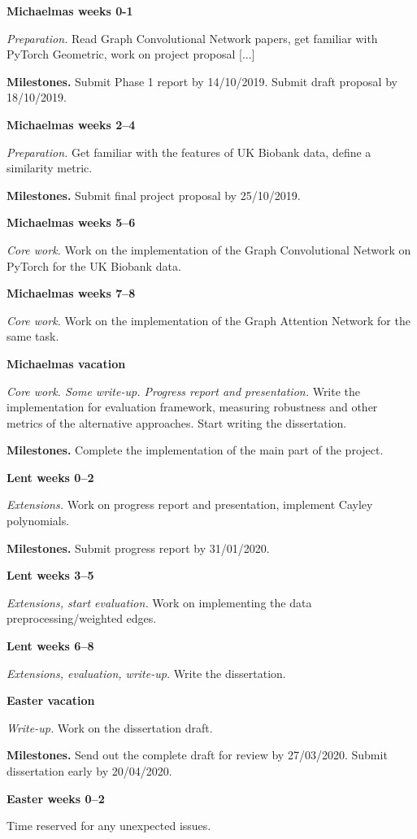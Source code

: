 \documentclass[12pt,a4paper,twoside]{article}
\begin{document}
\textbf{Michaelmas weeks 0-1}

\textit{Preparation.} Read Graph Convolutional Network papers, get familiar with PyTorch Geometric, work on project proposal [...]

\textbf{Milestones.} Submit Phase 1 report by 14/10/2019. Submit draft proposal by 18/10/2019.

\textbf{Michaelmas weeks 2–4}

\textit{Preparation.} Get familiar with the features of UK Biobank data, define a similarity metric.

\textbf{Milestones.} Submit final project proposal by 25/10/2019.

\textbf{Michaelmas weeks 5–6}

\textit{Core work.} Work on the implementation of the Graph Convolutional Network on PyTorch for the UK Biobank data.

\textbf{Michaelmas weeks 7–8} 

\textit{Core work.} Work on the implementation of the Graph Attention Network for the same task.

\textbf{Michaelmas vacation}

\textit{Core work. Some write-up. Progress report and presentation.}  Write the implementation for evaluation framework, measuring robustness and other metrics of the alternative approaches. Start writing the dissertation.

\textbf{Milestones.} Complete the implementation of the main part of the project.

\textbf{Lent weeks 0–2}

\textit{Extensions.} Work on progress report and presentation, implement Cayley polynomials.
 
\textbf{Milestones.} Submit progress report by 31/01/2020.


\textbf{Lent weeks 3–5}

\textit{Extensions, start evaluation.} Work on implementing the data preprocessing/weighted edges.

\textbf{Lent weeks 6–8}

\textit{Extensions, evaluation, write-up.} Write the dissertation.

\textbf{Easter vacation}

\textit{Write-up.} Work on the dissertation draft.

\textbf{Milestones.} Send out the complete draft for review by 27/03/2020. Submit dissertation early by 20/04/2020.

\textbf{Easter weeks 0–2}

 Time reserved for any unexpected issues.



\end{document}
